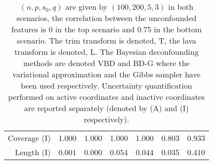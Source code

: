 \documentclass[11pt]{article}
\begin{document}
\begin{table}[h]
\begin{tabular}{r|cc|cc|cc}
Coverage (I)   & 1.000 & 1.000 & 1.000 & 1.000 & 0.803  & 0.933 \\
Length (I)     & 0.001 & 0.000 & 0.054 & 0.044 & 0.035  & 0.410 \\
\bottomrule
\end{tabular}
\caption{$(n, p, s_0, q) $ are given by $(100, 200, 5, 3)$ in both scenarios, the correlation between the unconfounded features is 0 in the top scenario and 0.75 in the bottom scenario. The trim transform is denoted, T, the lava transform is denoted, L. The Bayesian deconfounding methods are denoted VBD and BD-G where the variational approximation and the Gibbs sampler have been used respectively. Uncertainty quantification performed on active coordinates and inactive coordinates are reported separately (denoted by (A) and (I) respectively). }
\label{Tab:UQ}
\end{table}

\end{document}
